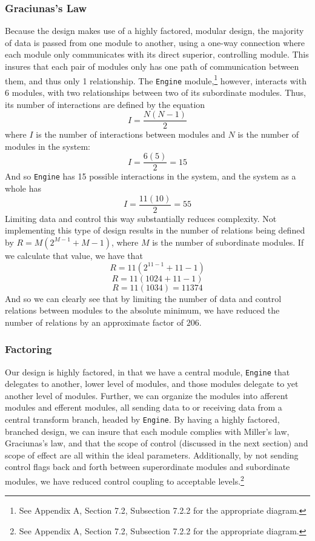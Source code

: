\documentclass{article}
\begin{document}
		\subsubsection{Graciunas's Law}
			Because the design makes use of a highly factored, modular design, the majority of data is passed from one module to another, using a one-way connection where each module only communicates with its direct superior, controlling module. This insures that each pair of modules only has one path of communication between them, and thus only 1 relationship. The \texttt{Engine} module,\footnote{See Appendix A, Section 7.2, Subsection 7.2.2 for the appropriate diagram.} however, interacts with 6 modules, with two relationships between two of its subordinate modules. Thus, its number of interactions are defined by the equation $$I = \frac{N(N - 1)}{2}$$
			where $I$ is the number of interactions between modules and $N$ is the number of modules in the system:
			$$I = \frac{6(5)}{2} = 15$$
			And so \texttt{Engine} has 15 possible interactions in the system, and the system as a whole has 
			$$I = \frac{11(10)}{2} = 55$$
			Limiting data and control this way substantially reduces complexity. Not implementing this type of design results in the number of relations being defined by $R = M(2^{M-1} + M - 1)$, where $M$ is the number of subordinate modules. If we calculate that value, we have that
			$$R = 11(2^{11-1} + 11 - 1)$$
			$$R = 11(1024 + 11 - 1)$$
			$$R = 11(1034) = 11374$$
			And so we can clearly see that by limiting the number of data and control relations between modules to the absolute minimum, we have reduced the number of relations by an approximate factor of $206$. 
		\subsubsection{Factoring}
			Our design is highly factored, in that we have a central module, \texttt{Engine} that delegates to another, lower level of modules, and those modules delegate to yet another level of modules. Further, we can organize the modules into afferent modules and efferent modules, all sending data to or receiving data from a central transform branch, headed by \texttt{Engine}. By having a highly factored, branched design, we can insure that each module complies with Miller's law, Graciunas's law, and that the scope of control (discussed in the next section) and scope of effect are all within the ideal parameters. Additionally, by not sending control flags back and forth between superordinate modules and subordinate modules, we have reduced control coupling to acceptable levels.\footnote{See Appendix A, Section 7.2, Subsection 7.2.2 for the appropriate diagram.}  
\end{document}
